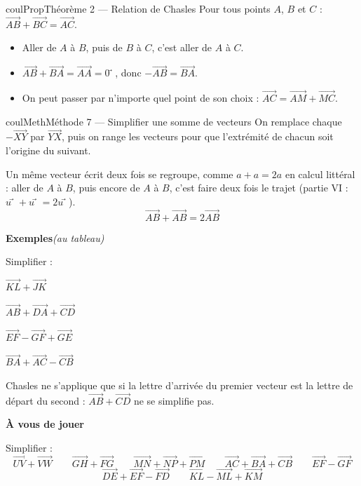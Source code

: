\documentclass[11pt,a4paper]{article}
\makeatletter
\newcommand{\vect}[1]{\overrightarrow{#1}}
\newcommand{\pt}[3]{\path (#1) node[croix]{} node[#2,font=\small,inner sep=2.5pt]{$#3$};}
\newcounter{lycee@signet}
\newcommand{\signet}[3][]{\stepcounter{lycee@signet}%
  \edef\lycee@dest{\if\relax\detokenize{#1}\relax
    signet.\arabic{lycee@signet}\else#1\fi}%
  \hypertarget{\lycee@dest}{}\bookmark[level=#2,dest=\lycee@dest]{#3}}
\def\vec#1{#1⃗}}%
\newcounter{methode}
\newenvironment{proprietebox}[1][Propriété]%
  {\begin{boitecours}[phantom={\signet{2}{#1}}]{coulProp}{#1}}{\end{boitecours}}
\newenvironment{methodebox}[1][Méthode]{\stepcounter{methode}%
  \begin{boitecours}[phantom={\signet[methode-\arabic{methode}]{2}{#1}}]{coulMeth}{#1}}%
  {\end{boitecours}}
\newcommand{\etape}[1]{\par\smallskip\textbf{\color{coulMeth}#1}\par\nobreak\smallskip}
\newcommand{\autableau}{\hfill{\footnotesize\itshape\color{black!45}(au tableau)}}
\newcommand{\etapeexemples}{%
    \par\smallskip\textbf{\color{coulMeth}Exemples}\autableau\par\nobreak\smallskip}
\makeatother
\begin{document}
\begin{proprietebox}[Théorème 2 --- Relation de Chasles]
Pour tous points $A$, $B$ et $C$ : \quad $\vect{AB}+\vect{BC}=\vect{AC}$.

\begin{itemize}
  \item Aller de $A$ à $B$, puis de $B$ à $C$, c'est aller de $A$ à $C$.
  \item $\vect{AB}+\vect{BA}=\vect{AA}=\vec{0}$, donc $-\vect{AB}=\vect{BA}$.
  \item On peut passer par n'importe quel point de son choix :
        $\vect{AC}=\vect{AM}+\vect{MC}$.
\end{itemize}
\begin{center}
\end{center}
\end{proprietebox}

\begin{methodebox}[Méthode 7 --- Simplifier une somme de vecteurs]
On remplace chaque $-\vect{XY}$ par $\vect{YX}$, puis on range les vecteurs pour que
l'extrémité de chacun soit l'origine du suivant.

Un même vecteur écrit deux fois se regroupe, comme $a+a=2a$ en calcul littéral :
aller de $A$ à $B$, puis encore de $A$ à $B$, c'est faire deux fois le trajet
(partie VI : $\vec{u}+\vec{u}=2\vec{u}$).
\[ \vect{AB}+\vect{AB}=2\vect{AB} \]
\etapeexemples
Simplifier :
\begin{questions}[label=\alph*)]
  \item $\vect{KL}+\vect{JK}$
  \item $\vect{AB}+\vect{DA}+\vect{CD}$
  \item $\vect{EF}-\vect{GF}+\vect{GE}$
  \item $\vect{BA}+\vect{AC}-\vect{CB}$
\end{questions}

\begin{remarquebox}
Chasles ne s'applique que si la lettre d'arrivée du premier vecteur est la lettre de
départ du second : $\vect{AB}+\vect{CD}$ ne se simplifie pas.
\end{remarquebox}

\etape{À vous de jouer}
Simplifier :
\[
  \vect{UV}+\vect{VW} \qquad \vect{GH}+\vect{FG} \qquad \vect{MN}+\vect{NP}+\vect{PM}
  \qquad \vect{AC}+\vect{BA}+\vect{CB} \qquad \vect{EF}-\vect{GF}
\]
\[
  \vect{DE}+\vect{EF}-\vect{FD} \qquad \vect{KL}-\vect{ML}+\vect{KM}
\]

\end{methodebox}
\end{document}
